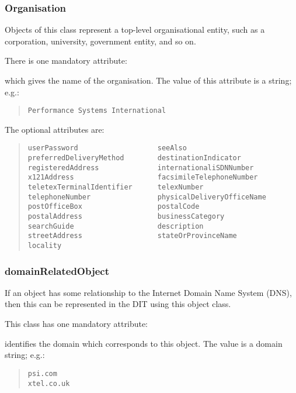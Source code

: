\subsubsection{Organisation}
Objects of this class represent a top-level organisational entity,
such as a corporation, university, government entity, and so on.

There is one mandatory attribute:
\begin{describe}
\item[\verb+organisationName+:]
			which gives the name of the organisation.
			The value of this attribute is a string; e.g.:
\begin{quote}\small\begin{verbatim}
Performance Systems International
\end{verbatim}\end{quote}
\end{describe}

The optional attributes are:
\begin{quote}\small\begin{verbatim}
userPassword                   seeAlso
preferredDeliveryMethod        destinationIndicator
registeredAddress              internationaliSDNNumber
x121Address                    facsimileTelephoneNumber
teletexTerminalIdentifier      telexNumber
telephoneNumber                physicalDeliveryOfficeName
postOfficeBox                  postalCode
postalAddress                  businessCategory
searchGuide                    description
streetAddress                  stateOrProvinceName
locality
\end{verbatim}\end{quote}

\subsubsection	{domainRelatedObject}
If an object has some relationship to the Internet Domain Name System (DNS),
then this can be represented in the DIT using this object class.

This class has one mandatory attribute:
\begin{describe}
\item[\verb+associatedDomain+:]
			identifies the domain which corresponds to this object.
			The value is a domain string; e.g.:
\begin{quote}\small\begin{verbatim}
psi.com
xtel.co.uk
\end{verbatim}\end{quote}
\end{describe}

